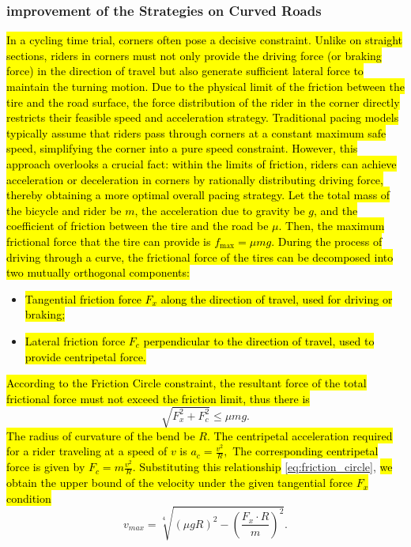 \documentclass{mcmthesis}
\begin{document}
\subsubsection{improvement of the Strategies on Curved Roads}
\hl{In a cycling time trial, corners often pose a decisive constraint. Unlike on straight sections, riders in corners must not only provide the driving force (or braking force) in the direction of travel but also generate sufficient lateral force to maintain the turning motion. Due to the physical limit of the friction between the tire and the road surface, the force distribution of the rider in the corner directly restricts their feasible speed and acceleration strategy. 
Traditional pacing models typically assume that riders pass through corners at a constant maximum safe speed, simplifying the corner into a pure speed constraint. However, this approach overlooks a crucial fact: within the limits of friction, riders can achieve acceleration or deceleration in corners by rationally distributing driving force, thereby obtaining a more optimal overall pacing strategy. 
Let the total mass of the bicycle and rider be $m$, the acceleration due to gravity be $g$, and the coefficient of friction between the tire and the road be $\mu$. 
Then, the maximum frictional force that the tire can provide is $f_{\max} = \mu m g .$
During the process of driving through a curve, the frictional force of the tires can be decomposed into two mutually orthogonal components: 
}\begin{itemize}
\item\hl{ Tangential friction force $F_x$ along the direction of travel, used for driving or braking;}
\item \hl{Lateral friction force $F_c$ perpendicular to the direction of travel, used to provide centripetal force.}
 \end{itemize}
\hl{According to the Friction Circle constraint, the resultant force of the total frictional force must not exceed the friction limit, thus there is 
}\begin{equation}
\sqrt{F_x^2 + F_c^2} \leq \mu m g .
\label{eq:friction_circle}
\end{equation}
\hl{The radius of curvature of the bend be $R$. 
The centripetal acceleration required for a rider traveling at a speed of $v$ is $a_c = \frac{v^2}{R},$
The corresponding centripetal force is given by $F_c = m \frac{v^2}{R}.$ 
Substituting this relationship } \autoref{eq:friction_circle},\hl{ we obtain 
the upper bound of the velocity under the given tangential force $F_x$ condition 
}
\begin{equation}
v_{max} =
\sqrt[4]{\left( \mu g R \right)^2 - \left( \frac{F_x \cdot R}{m} \right)^2 }.
\label{eq:vmax_corner}
\end{equation}
\end{document}
